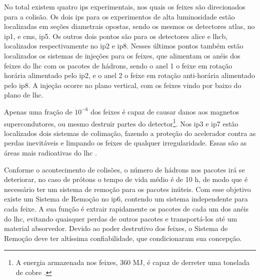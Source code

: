 No total existem quatro \glspl{ip} experimentais, nos quais os feixes são
direcionados para a colisão. Os dois \glspl{ip} para
os experimentos de alta luminosidade estão localizadas em seções diametrais
opostas, sendo os mesmos os detectores \acrshort{atlas}, no \gls{ip}1, e
\acrshort{cms}, \gls{ip}5. 
Os outros dois pontos são para os detectores \acrshort{alice} e
\acrshort{lhcb}, localizados respectivamente no \gls{ip}2 e \gls{ip}8. Nesses últimos
pontos também estão localizados os sistemas de injeções para os feixes, que
alimentam os anéis dos feixes do \gls{lhc} 
com os pacotes de hádrons, sendo o anel 1 o feixe em rotação horária alimentado
pelo \gls{ip}2, e o anel 2 o 
feixe em rotação anti-horária alimentado pelo \gls{ip}8. 
A injeção ocorre no plano vertical, com os feixes
vindo por baixo do plano de \gls{lhc}. 

Apenas uma fração de $10^{-6}$ dos feixes é capaz de causar
danos aos magnetos supercondutores, ou mesmo destruir partes do detector\footnote{A 
energia armazenada nos feixes, 360 MJ, é capaz de derreter uma tonelada 
de cobre \cite{closerLook,lhc_design}.}. Nos \gls{ip}3 e \gls{ip}7 estão localizados 
dois sistemas de colimação, fazendo a proteção 
do acelerador contra as perdas inevitáveis e limpando os feixes de
qualquer irregularidade. Essas são as áreas mais radioativas do \gls{lhc} 
\cite{lhc_design}.

Conforme o acontecimento de colisões, o número de hádrons nos pacotes irá se
deteriorar, no caso de prótons o tempo de vida médio é de 10 h, de modo que é necessário ter um 
sistema de remoção para os pacotes inúteis. Com esse objetivo existe um Sistema de Remoção no
\gls{ip}6, contendo um sistema independente para cada feixe. 
A sua função é extrair rapidamente os pacotes de cada um dos anéis do \gls{lhc}, evitando quaisquer
perdas de outros pacotes e transportá-los até um material
absorvedor. Devido ao poder destrutivo dos feixes, o Sistema de Remoção deve ter
altíssima confiabilidade, que condicionaram sua concepção.


